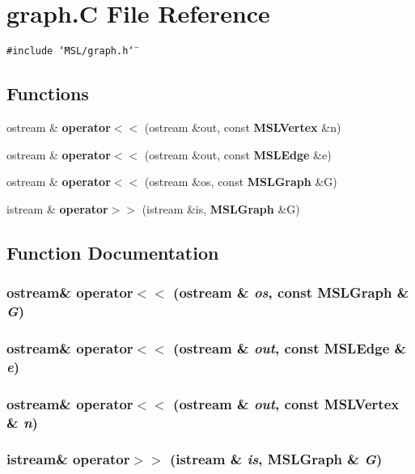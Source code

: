 \section{graph.C File Reference}
\label{graph_8C}
{\tt \#include \char`\"{}MSL/graph.h\char`\"{}}\par
\subsection*{Functions}
\begin{CompactItemize}
\item 
ostream \& {\bf operator$<$$<$} (ostream \&out, const {\bf MSLVertex} \&n)
\item 
ostream \& {\bf operator$<$$<$} (ostream \&out, const {\bf MSLEdge} \&e)
\item 
ostream \& {\bf operator$<$$<$} (ostream \&os, const {\bf MSLGraph} \&G)
\item 
istream \& {\bf operator$>$$>$} (istream \&is, {\bf MSLGraph} \&G)
\end{CompactItemize}


\subsection{Function Documentation}
\subsubsection{\setlength{\rightskip}{0pt plus 5cm}ostream\& operator$<$$<$ (ostream \& {\em os}, const {\bf MSLGraph} \& {\em G})}\label{graph_8C_a2}


\subsubsection{\setlength{\rightskip}{0pt plus 5cm}ostream\& operator$<$$<$ (ostream \& {\em out}, const {\bf MSLEdge} \& {\em e})}\label{graph_8C_a1}


\subsubsection{\setlength{\rightskip}{0pt plus 5cm}ostream\& operator$<$$<$ (ostream \& {\em out}, const {\bf MSLVertex} \& {\em n})}\label{graph_8C_a0}


\subsubsection{\setlength{\rightskip}{0pt plus 5cm}istream\& operator$>$$>$ (istream \& {\em is}, {\bf MSLGraph} \& {\em G})}\label{graph_8C_a3}


